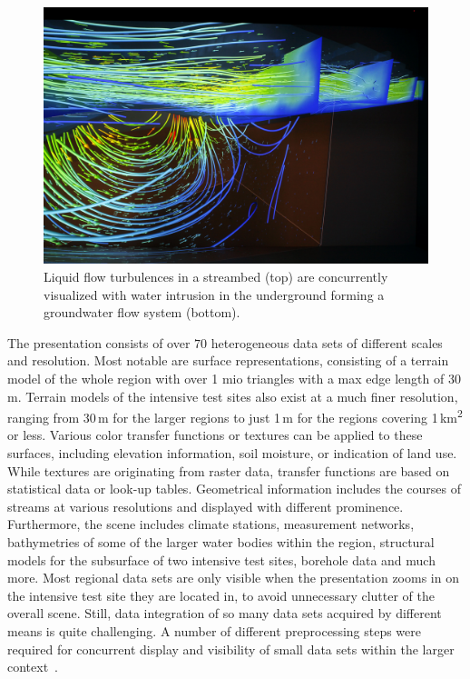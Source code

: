\documentclass[twocolumn]{svjour3}          %
\begin{document}
\begin{figure}[htb]
  \includegraphics[width=\linewidth]{images/streambed.jpg}
\caption{Liquid flow turbulences in a streambed (top) are concurrently visualized with water intrusion in the underground forming a groundwater flow system (bottom).}
\label{fig:streambed}
\end{figure}

The presentation consists of over $70$ heterogeneous data sets of different scales and resolution. Most notable are surface representations, consisting of a terrain model of the whole region with over 1 mio triangles with a max edge length of 30\,m. Terrain models of the intensive test sites also exist at a much finer resolution, ranging from 30\,m for the larger regions to just 1\,m for the regions covering 1\,km\textsuperscript{2} or less. Various color transfer functions or textures can be applied to these surfaces, including elevation information, soil moisture, or indication of land use. While textures are originating from raster data, transfer functions are based on statistical data or look-up tables. Geometrical information includes the courses of streams at various resolutions and displayed with different prominence. Furthermore, the scene includes climate stations, measurement networks, bathymetries of some of the larger water bodies within the region, structural models for the subsurface of two intensive test sites, borehole data and much more. Most regional data sets are only visible when the presentation zooms in on the intensive test site they are located in, to avoid unnecessary clutter of the overall scene. Still, data integration of so many data sets acquired by different means is quite challenging. A number of different preprocessing steps were required for concurrent display and visibility of small data sets within the larger context~\cite{rink:wessti, rink:eesenvirvis}.
\end{document}
